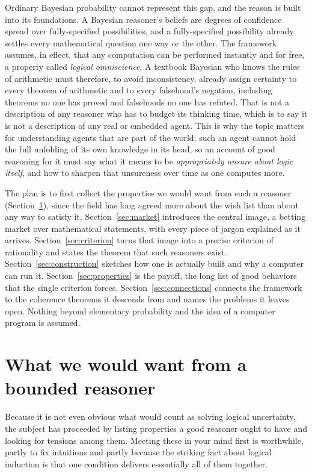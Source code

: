 \documentclass[10pt]{article}
\theoremstyle{definition}
\theoremstyle{remark}
\begin{document}
Ordinary Bayesian probability cannot represent this gap, and the reason is built into its foundations. A Bayesian reasoner's beliefs are degrees of confidence spread over fully-specified possibilities, and a fully-specified possibility already settles every mathematical question one way or the other. The framework assumes, in effect, that any computation can be performed instantly and for free, a property called \emph{logical omniscience}. A textbook Bayesian who knows the rules of arithmetic must therefore, to avoid inconsistency, already assign certainty to every theorem of arithmetic and to every falsehood's negation, including theorems no one has proved and falsehoods no one has refuted. That is not a description of any reasoner who has to budget its thinking time, which is to say it is not a description of any real or embedded agent. This is why the topic matters for understanding agents that are part of the world: such an agent cannot hold the full unfolding of its own knowledge in its head, so an account of good reasoning for it must say what it means to be \emph{appropriately unsure about logic itself}, and how to sharpen that unsureness over time as one computes more.

The plan is to first collect the properties we would want from such a reasoner (Section~\ref{sec:desiderata}), since the field has long agreed more about the wish list than about any way to satisfy it. Section~\ref{sec:market} introduces the central image, a betting market over mathematical statements, with every piece of jargon explained as it arrives. Section~\ref{sec:criterion} turns that image into a precise criterion of rationality and states the theorem that such reasoners exist. Section~\ref{sec:construction} sketches how one is actually built and why a computer can run it. Section~\ref{sec:properties} is the payoff, the long list of good behaviors that the single criterion forces. Section~\ref{sec:connections} connects the framework to the coherence theorems it descends from and names the problems it leaves open. Nothing beyond elementary probability and the idea of a computer program is assumed.

\section{What we would want from a bounded reasoner}
\label{sec:desiderata}

Because it is not even obvious what would count as solving logical uncertainty, the subject has proceeded by listing properties a good reasoner ought to have and looking for tensions among them. Meeting these in your mind first is worthwhile, partly to fix intuitions and partly because the striking fact about logical induction is that one condition delivers essentially all of them together.
\end{document}
